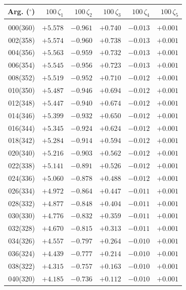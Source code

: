 \clearpage
\begin{table}[!h]
\vspace{0.25cm}
\centering
\begin{tabular}{rrrrrr}
Arg. ($^\circ$) & $100\,\zeta_1$  & $100\,\zeta_2$ & $100\,\zeta_3$ & $100\,\zeta_4$  & $100\,\zeta_5$  \\\hline
&&&&&\\[-1.75ex]
000(360) & $+5.578$ & $-0.961$ & $+0.740$ & $-0.013$ & $+0.001$ \\
002(358) & $+5.574$ & $-0.960$ & $+0.738$ & $-0.013$ & $+0.001$ \\ 
004(356) & $+5.563$ & $-0.959$ & $+0.732$ & $-0.013$ & $+0.001$ \\ 
006(354) & $+5.545$ & $-0.956$ & $+0.723$ & $-0.013$ & $+0.001$ \\ 
008(352) & $+5.519$ & $-0.952$ & $+0.710$ & $-0.012$ & $+0.001$ \\
010(350) & $+5.487$ & $-0.946$ & $+0.694$ & $-0.012$ & $+0.001$ \\ 
012(348) & $+5.447$ & $-0.940$ & $+0.674$ & $-0.012$ & $+0.001$ \\
014(346) & $+5.399$ & $-0.932$ & $+0.650$ & $-0.012$ & $+0.001$ \\ 
016(344) & $+5.345$ & $-0.924$ & $+0.624$ & $-0.012$ & $+0.001$ \\ 
018(342) & $+5.284$ & $-0.914$ & $+0.594$ & $-0.012$ & $+0.001$ \\ 
020(340) & $+5.216$ & $-0.903$ & $+0.562$ & $-0.012$ & $+0.001$ \\ 
022(338) & $+5.141$ & $-0.891$ & $+0.526$ & $-0.012$ & $+0.001$ \\
024(336) & $+5.060$ & $-0.878$ & $+0.488$ & $-0.012$ & $+0.001$ \\ 
026(334) & $+4.972$ & $-0.864$ & $+0.447$ & $-0.011$ & $+0.001$ \\ 
028(332) & $+4.877$ & $-0.848$ & $+0.404$ & $-0.011$ & $+0.001$ \\ 
030(330) & $+4.776$ & $-0.832$ & $+0.359$ & $-0.011$ & $+0.001$ \\ 
032(328) & $+4.670$ & $-0.815$ & $+0.313$ & $-0.011$ & $+0.001$ \\ 
034(326) & $+4.557$ & $-0.797$ & $+0.264$ & $-0.010$ & $+0.001$ \\ 
036(324) & $+4.439$ & $-0.777$ & $+0.214$ & $-0.010$ & $+0.001$ \\ 
038(322) & $+4.315$ & $-0.757$ & $+0.163$ & $-0.010$ & $+0.001$ \\ 
040(320) & $+4.185$ & $-0.736$ & $+0.112$ & $-0.010$ & $+0.001$ \\ 

\end{tabular}
\end{table}
